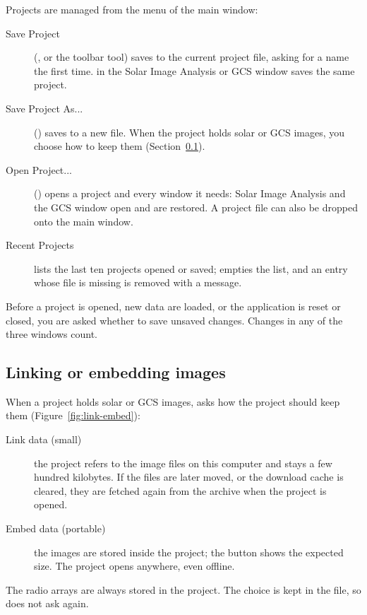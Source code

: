 Projects are managed from the  menu of the main window:
\begin{description}
  \item[Save Project] (, or the toolbar tool) saves to the current project
    file, asking for a name the first time.  in the Solar Image Analysis or GCS
    window saves the same project.
  \item[Save Project As...] () saves to a new file. When the project holds
    solar or GCS images, you choose how to keep them (Section~\ref{sec:link-embed}).
  \item[Open Project...] () opens a project and every window it needs:
    Solar Image Analysis and the GCS window open and are restored. A project file can also be
    dropped onto the main window.
  \item[Recent Projects] lists the last ten projects opened or saved;
     empties the list, and an entry whose file is missing is
    removed with a message.
\end{description}
Before a project is opened, new data are loaded, or the application is reset or closed, you
are asked whether to save unsaved changes. Changes in any of the three windows count.

\subsection{Linking or embedding images}
\label{sec:link-embed}

When a project holds solar or GCS images,  asks how the project
should keep them (Figure~\ref{fig:link-embed}):
\begin{description}
  \item[Link data (small)] the project refers to the image files on this computer and stays a
    few hundred kilobytes. If the files are later moved, or the download cache is cleared,
    they are fetched again from the archive when the project is opened.
  \item[Embed data (portable)] the images are stored inside the project; the button shows the
    expected size. The project opens anywhere, even offline.
\end{description}
The radio arrays are always stored in the project. The choice is kept in the file, so
 does not ask again.


